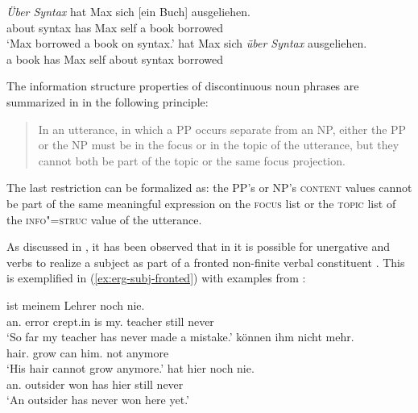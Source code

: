 \documentclass[output=paper]{langsci/langscibook}
\begin{document}
\begin{exe}
  \ex\label{ex:np-pp} \begin{xlist}
    \ex\label{ex:simple-fronted-pp}\gll \textsl{Über Syntax} hat Max sich [ein
 Buch] ausgeliehen.\\
         {about syntax} has Max self { a} book borrowed\\
       \trans `Max borrowed a book on syntax.'
    \ex\label{ex:simple-fronted-np} hat Max sich \textsl{über Syntax}    ausgeliehen.\\
 { a} book has Max self {about syntax} borrowed\\
\end{xlist}
\end{exe}

The information structure properties of discontinuous noun phrases are
summarized in \citet[176]{deKuthy2002a} in the following principle:
\begin{quote}
  In an utterance, in which a PP occurs separate from an NP, either
  the PP or the NP must be in the focus or in the topic of the
  utterance, but they cannot both be part of the topic or the same
  focus projection. \citep[176]{deKuthy2002a}
\end{quote}

The last restriction can be formalized as: the PP's or NP's
\textsc{content} values cannot be part of the same
meaningful expression on the \textsc{focus} list or the \textsc{topic}
list of the \textsc{info"=struc} value of the utterance.

As discussed in \cite{dKM2003a}, it has been observed that in
 it is possible for unergative and  verbs to
realize a subject as part of a fronted non-finite verbal
constituent \citep{Haider90-ohne-crossref}. This is exemplified in (\ref{ex:erg-subj-fronted}) with examples from \citet[94]{Haider90-ohne-crossref}:

\begin{exe}
\ex\label{ex:erg-subj-fronted}
  \begin{xlist}
  \ex\label{ex:erg-subj-fronted-indef} ist meinem Lehrer noch nie.\\
         {\LB}an.\nom{} error {crept.in} is my.\dat{} teacher still never\\
         \trans `So far my teacher has never made a mistake.'
  \ex{} können ihm nicht mehr.\\
          {\LB}hair.\nom{} grow can him.\dat{} not anymore\\
          \trans `His hair cannot grow anymore.'
\ex\label{ex:nonerg-subj-fronted}
       hat hier noch nie.\\
           {\LB}an.\nom{} outsider won has hier still never\\
        \trans `An outsider has never won here yet.' 
  \end{xlist}
\end{exe}
\end{document}
